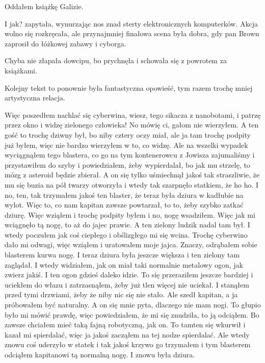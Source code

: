 Oddałem książkę Galizie.

\begin{dialogue}
	\ds{} I jak? \dm{} zapytała, wynurzając nos znad sterty elektronicznych komputerków.
	\ds{} Akcja wolno się rozkręcała, ale przynajmniej finałowa scena była dobra, gdy pan Brown zaprosił do łóżkowej zabawy i cyborga.
\end{dialogue}

Chyba nie złapała dowcipu, bo prychnęła i schowała się z powrotem za książkami.

Kolejny tekst to ponownie była fantastyczna opowieść, tym razem trochę mniej artystyczna relacja.

\begin{poem}
	Więc poszedłem nachlać się cyberwina, wiesz, tego sikacza z nanobotami, i patrzę przez okno i widzę zielonego człowieka!
	No mówię ci, gałom nie wierzyłem. A ten gość to trochę dziwny był, bo niby cztery oczy miał, ale ja tam trochę podpity już byłem, więc nie bardzo wierzyłem w to, co widzę.
	Ale na wszelki wypadek wyciągnąłem tego blastera, co go na tym kontenerowcu z Jowisza zajumaliśmy i przystawiłem do szyby i powiedziałem, żeby wypierdalał, bo jak mu strzelę, to mózg z asteroid będzie zbierał.
	A on się tylko uśmiechnął jakoś tak straszliwie, że mu się buzia na pół twarzy otworzyła i wtedy tak szarpnęło statkiem, że ho ho.
	I no, ten, tak trzymałem jakoś ten blaster, że teraz była dziura w kadłubie na wylot. Więc to, co nam kapitan zawsze powtarzał, to to, żeby szybko zatkać dziurę.
	Więc wziąłem i trochę podpity byłem i no, nogę wsadziłem.
	Więc jak mi wciągnęło tą nogę, to aż do jajec prawie. A ten zielony ludzik nadal tam był. I wtedy poczułem jak coś ciepłego i obślizgłego mi się wcina.
	Trochę cyberwino dało mi odwagi, więc wziąłem i uratowałem moje jajca.
	Znaczy, odrąbałem sobie blasterem kurwa nogę. 
	I teraz dziura była jeszcze większa i ten zielony tam zaglądał.
	I wtedy widziałem, jak on miał taki normalnie metalowy ogon, jak zwierz jakiś. I ten ogon gdzieś daleko idzie.
	To się przeraziłem jeszcze bardziej i uciekłem do włazu i zatrzasnąłem, żeby już tlen więcej nie uciekał.
	I stanąłem przed tymi drzwiami, żeby że niby nic się nie stało. Ale szedł kapitan, a ja próbowałem być naturalny.
	A on się mnie pyta, dlaczego nie mam nogi.
	To głupio było mi mówić prawdę, więc powiedziałem, że mi się znudziła, to ją odciąłem. Bo zawsze chciałem mieć taką fajną robotyczną, jak on.
	To tamten się wkurwił i kazał mi spierdalać, więc ja jakoś zacząłem na tej nodze spierdalać.
	Ale wtedy znowu coś uderzyło w statek i tak jakoś krzywo go trzymałem i tym blasterem odciąłem kapitanowi tą normalną nogę. I znowu była dziura.

\end{poem}
